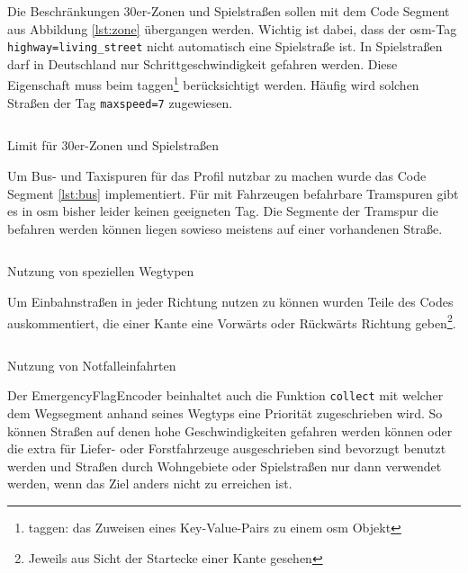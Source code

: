 Die Beschränkungen 30er-Zonen und Spielstraßen sollen mit dem Code Segment aus Abbildung \ref{lst:zone} übergangen werden.
Wichtig ist dabei, dass der \gls{osm}-Tag \texttt{highway=living\_street} nicht automatisch eine Spielstraße ist.
In Spielstraßen darf in Deutschland nur Schrittgeschwindigkeit gefahren werden.
Diese Eigenschaft muss beim taggen\footnote{taggen: das Zuweisen eines Key-Value-Pairs zu einem \gls{osm} Objekt} berücksichtigt werden.
Häufig wird solchen Straßen der Tag \texttt{maxspeed=7} zugewiesen.

\begin{listing}[htb]
\centering
{}
\inputminted[gobble=2, fontsize=\footnotesize, breaklines=true, breakbytoken=|, firstline=275, lastline=280]{java}{../data/JavaFiles/EmergencyFlagEncoder.java}
\caption{Limit für 30er-Zonen und Spielstraßen}
\label{lst:zone}
\end{listing}

Um Bus- und Taxispuren für das Profil nutzbar zu machen wurde das Code Segment \ref{lst:bus} implementiert.
Für mit Fahrzeugen befahrbare Tramspuren gibt es in \gls{osm} bisher leider keinen geeigneten Tag.
Die Segmente der Tramspur die befahren werden können liegen sowieso meistens auf einer vorhandenen Straße.

\begin{listing}[htb]
\centering
{}
\inputminted[gobble=8, fontsize=\footnotesize, breaklines=true, breakbytoken=|, firstline=366, lastline=373]{java}{../data/JavaFiles/EmergencyFlagEncoder.java}
\caption{Nutzung von speziellen Wegtypen}
\label{lst:bus}
\end{listing}

Um Einbahnstraßen in jeder Richtung nutzen zu können wurden Teile des Codes auskommentiert, die einer Kante eine Vorwärts oder Rückwärts Richtung geben\footnote{Jeweils aus Sicht der Startecke einer Kante gesehen}.

\begin{listing}[htb]
\centering
{}
\inputminted[gobble=1, fontsize=\footnotesize, breaklines=true, breakbytoken=|, firstline=503, lastline=504]{java}{../data/JavaFiles/EmergencyFlagEncoder.java}
\caption{Nutzung von Notfalleinfahrten}
\label{lst:weight}
\end{listing}

Der EmergencyFlagEncoder beinhaltet auch die Funktion \texttt{collect} mit welcher dem Wegsegment anhand seines Wegtyps eine Priorität zugeschrieben wird.
So können Straßen auf denen hohe Geschwindigkeiten gefahren werden können oder die extra für Liefer- oder Forstfahrzeuge ausgeschrieben sind bevorzugt benutzt werden und Straßen durch Wohngebiete oder Spielstraßen nur dann verwendet werden, wenn das Ziel anders nicht zu erreichen ist.


